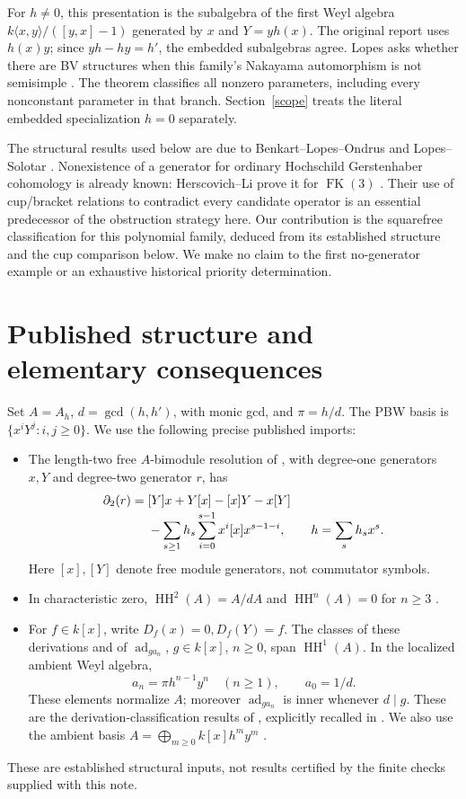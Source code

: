 \documentclass[11pt]{article}
\theoremstyle{remark}\newtheorem{remark}[theorem]{Remark}
\newcommand{\HH}{\operatorname{HH}}
\newcommand{\ad}{\operatorname{ad}}
\begin{document}
For \(h\ne0\), this presentation is the subalgebra of the first Weyl algebra
\(k\langle x,y\rangle/([y,x]-1)\) generated by \(x\) and \(Y=yh(x)\).
The original report uses \(h(x)y\); since \(yh-hy=h'\), the embedded
subalgebras agree. Lopes asks whether there are BV structures when this
family's Nakayama automorphism is not semisimple \cite[Question~(2)]{OWR}.
The theorem classifies all nonzero parameters, including every nonconstant
parameter in that branch. Section~\ref{scope} treats the literal embedded
specialization \(h=0\) separately.

The structural results used below are due to Benkart--Lopes--Ondrus
\cite{BLO} and Lopes--Solotar \cite{LS}. Nonexistence of a generator for
ordinary Hochschild Gerstenhaber cohomology is already known:
Herscovich--Li prove it for \(\operatorname{FK}(3)\)
\cite[Proposition~4.15]{HL}. Their use of cup/bracket relations to contradict
every candidate operator is an essential predecessor of the obstruction
strategy here. Our contribution is the squarefree classification for this
polynomial family, deduced from its established structure and the cup
comparison below. We make no claim to the first no-generator example or
an exhaustive historical priority determination.

\section{Published structure and elementary consequences}
Set \(A=A_h\), \(d=\gcd(h,h')\), with monic gcd, and \(\pi=h/d\).
The PBW basis is \(\{x^iY^j:i,j\ge0\}\). We use the following precise
published imports:
\begin{itemize}
\item The length-two free \(A\)-bimodule resolution of \cite[\S3,
(3.1)]{LS}, with degree-one generators \(x,Y\) and degree-two generator
\(r\), has
\begin{align}
\partial_2(r)
 ={}&[Y]x+Y[x]-[x]Y-x[Y]\notag\\[-2pt]
 &-\sum_{s\ge1}h_s\sum_{i=0}^{s-1}x^i[x]x^{s-1-i},
 \qquad h=\sum_s h_sx^s. \label{small}
\end{align}
Here \([x],[Y]\) denote free module generators, not commutator symbols.
\item In characteristic zero, \(\HH^2(A)=A/dA\) and
\(\HH^n(A)=0\) for \(n\ge3\)
\cite[Proposition~3.9 and Corollary~3.11]{LS}.
\item For \(f\in k[x]\), write \(D_f(x)=0,D_f(Y)=f\).
The classes of these derivations and of
\(\ad_{g a_n}\), \(g\in k[x]\), \(n\ge0\), span \(\HH^1(A)\).
In the localized ambient Weyl algebra,
\[
 a_n=\pi h^{n-1}y^n\quad(n\ge1),\qquad a_0=1/d.
\]
These elements normalize \(A\); moreover \(\ad_{g a_n}\) is inner
whenever \(d\mid g\). These are the derivation-classification results
of \cite[Theorems~5.3, 5.7, 5.13 and Proposition~5.9]{BLO},
explicitly recalled in \cite[\S6.1 and Theorem~6.2]{LS}.
We also use the ambient basis
\(A=\bigoplus_{m\ge0}k[x]h^m y^m\)
\cite[Proposition~2.1(b)]{LS}.
\end{itemize}
These are established structural inputs, not results certified by the
finite checks supplied with this note.
\end{document}
